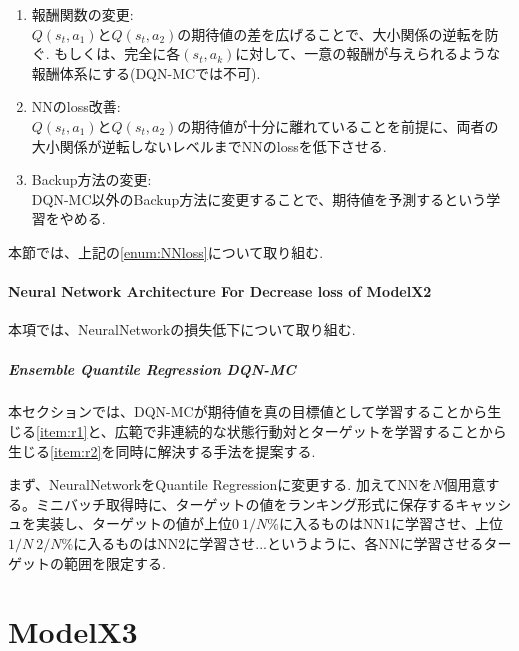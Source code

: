 \documentclass[twocolumn, a4j, 10pt, fleqn]{ltjsarticle}
\begin{document}
\begin{enumerate}
  \item 報酬関数の変更:\\
        $Q(s_t, a_1)$と$Q(s_t, a_2)$の期待値の差を広げることで、大小関係の逆転を防ぐ. もしくは、完全に各$(s_t, a_k)$に対して、一意の報酬が与えられるような報酬体系にする(DQN-MCでは不可).
  \item NNのloss改善:\label{enum:NNloss}\\
        $Q(s_t, a_1)$と$Q(s_t, a_2)$の期待値が十分に離れていることを前提に、両者の大小関係が逆転しないレベルまでNNのlossを低下させる.
  \item Backup方法の変更:\\
        DQN-MC以外のBackup方法に変更することで、期待値を予測するという学習をやめる.
\end{enumerate}
本節では、上記の\ref{enum:NNloss}について取り組む.

\subsection{Neural Network Architecture For Decrease loss of ModelX2}
本項では、NeuralNetworkの損失低下について取り組む.

\subsubsection{Ensemble Quantile Regression DQN-MC}
本セクションでは、DQN-MCが期待値を真の目標値として学習することから生じる\ref{item:r1}と、広範で非連続的な状態行動対とターゲットを学習することから生じる\ref{item:r2}を同時に解決する手法を提案する.

まず、NeuralNetworkをQuantile Regressionに変更する.
加えてNNを$N$個用意する。ミニバッチ取得時に、ターゲットの値をランキング形式に保存するキャッシュを実装し、ターゲットの値が上位$0~1/N \%$に入るものはNN$1$に学習させ、上位$1/N~2/N \%$に入るものはNN$2$に学習させ...というように、各NNに学習させるターゲットの範囲を限定する.

\part{ModelX3}
\end{document}
